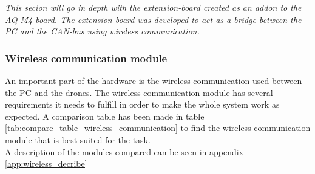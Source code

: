 \textit{This secion will go in depth with the extension-board created as an addon to the AQ M4 board. The extension-board was developed to act as a bridge between the PC and the CAN-bus using wireless communication.} \\

\subsubsection*{Wireless communication module} \label{sec:wireless_communication_module}
An important part of the hardware is the wireless communication used between the PC and the drones.
The wireless communication module has several requirements it needs to fulfill in order to make the whole system work as expected. A comparison table has been made in table \ref{tab:compare_table_wireless_communication} to find the wireless communication module that is best suited for the task. \\

A description of the modules compared can be seen in appendix \ref{app:wireless_decribe}

